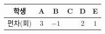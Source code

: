 {\renewcommand{\arraystretch}{1.35}\small
\begin{tabular}{|c|c|c|c|c|c|}
\hline
학생 & A & B & C & D & E \\ \hline
편차(회) & $3$ & $-1$ & & $2$ & $1$ \\ \hline
\end{tabular}}
